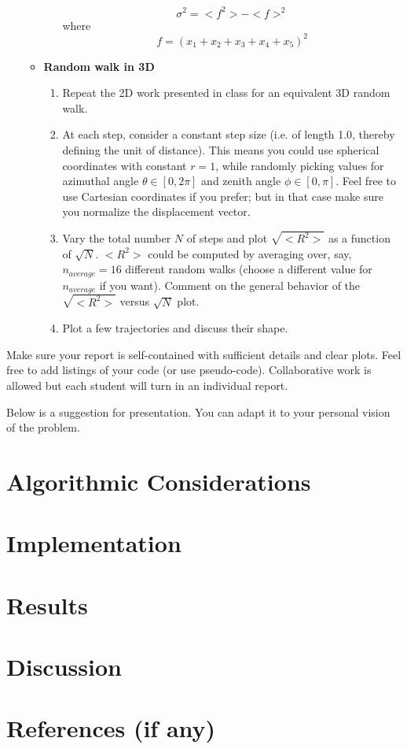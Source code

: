 \documentclass{report}
\begin{document}
\begin{enumerate}
\begin{itemize}
\begin{enumerate}
\begin{equation}
\sigma^2=<f^2>-<f>^2
\end{equation}
where 
\begin{equation}
f=(x_1+x_2+x_3+x_4+x_5)^2
\end{equation}
\end{enumerate}
\item \textbf{Random walk in 3D}
  \begin{enumerate}
\item Repeat the 2D work presented in class for an equivalent 3D random walk.
\item At each step, consider a constant step size (i.e. of length 1.0,
  thereby defining the unit of distance). This means you could use
  spherical coordinates with constant $r=1$, while randomly picking
  values for azimuthal angle $\theta \in [0,2\pi]$ and zenith angle
  $\phi\in[0,\pi]$. Feel free to use Cartesian coordinates if you
  prefer; but in that case make sure you normalize the displacement
  vector.
\item Vary the total number $N$ of steps and plot $\sqrt{<R^2>}$ as a
  function of $\sqrt{N}$. $<R^2>$ could be computed by averaging over,
  say, $n_{average}=16$ different random walks (choose a different
  value for $n_{average}$ if you want). Comment on the general
  behavior of the $\sqrt{<R^2>}$ versus $\sqrt{N}$ plot.
\item Plot a few trajectories and discuss their shape.
\end{enumerate}
\end{itemize}
\end{enumerate}

Make sure your report is self-contained with sufficient details and
clear plots. Feel free to add listings of your code (or use
pseudo-code). Collaborative work is allowed but each student will turn
in an individual report.

Below is a suggestion for presentation. You can adapt it to your personal vision of the problem.
\section{Algorithmic Considerations}
\section{Implementation}
\section{Results}
\section{Discussion}
\section{References (if any)}
\end{document}
